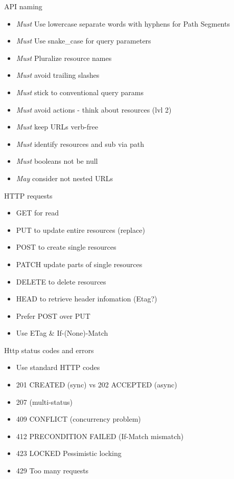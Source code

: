 \documentclass[10pt]{beamer}
\begin{document}
\begin{frame}{API naming}
  \begin{itemize}
    \item \emph{Must} Use lowercase separate words with hyphens for Path Segments
    \item \emph{Must} Use snake\_case for query parameters
    \item \emph{Must} Pluralize resource names
    \item \emph{Must} avoid trailing slashes
    \item \emph{Must} stick to conventional query params
    \item \emph{Must} avoid actions - think about resources (lvl 2)
    \item \emph{Must} keep URLs verb-free
    \item \emph{Must} identify resources and sub via path
    \item \emph{Must} booleans not be null
    \item \emph{May} consider not nested URLs
  \end{itemize}
\end{frame}

\begin{frame}{HTTP requests}
  \begin{itemize}
    \item GET for read
    \item PUT to update entire resources (replace)
    \item POST to create single resources
    \item PATCH update parts of single resources
    \item DELETE to delete resources
    \item HEAD to retrieve header infomation (Etag?)
    \item Prefer POST over PUT
    \item Use ETag \& If-(None)-Match
  \end{itemize}
\end{frame}

\begin{frame}{Http status codes and errors}
  \begin{itemize}
    \item Use standard HTTP codes
    \item 201 CREATED (sync) vs 202 ACCEPTED (async)
    \item 207 (multi-status)
    \item 409 CONFLICT (concurrency problem)
    \item 412 PRECONDITION FAILED (If-Match mismatch)
    \item 423 LOCKED Pessimistic locking
    \item 429 Too many requests
  \end{itemize}
\end{frame}
\end{document}
